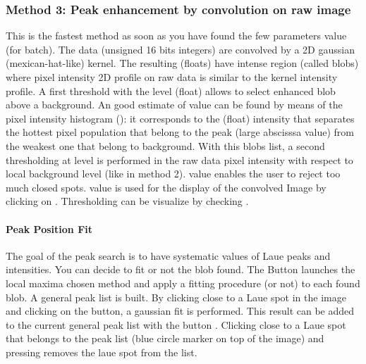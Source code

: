 \documentclass[letterpaper,10pt,english]{sphinxmanual}
\begin{document}
\subsubsection{Method 3: Peak enhancement by convolution on raw image}
\label{\detokenize{PeakSearchGUI:method-3-peak-enhancement-by-convolution-on-raw-image}}
This is the fastest method as soon as you have found the few parameters value (for batch). The  data (unsigned 16 bits integers) are convolved by a 2D gaussian (mexican-hat-like) kernel. The resulting  (floats) have intense region (called blobs) where pixel intensity 2D profile on raw data is similar to the kernel intensity profile.
A first threshold with the level  (float) allows to select enhanced blob above a background. An good estimate of  value can be found by means of the pixel intensity histogram (): it corresponds to the (float) intensity that separates the hottest pixel population that belong to the peak (large abscisssa value) from the weakest one that belong to background.
With this blobs list, a second thresholding at  level is performed in the raw data pixel intensity with respect to local background level (like in method 2).
 value enables the user to reject too much closed spots.
 value is used for the display of the convolved Image by clicking on . Thresholding can be visualize by checking .

\noindent{}


\paragraph{Peak Position Fit}
\label{\detokenize{PeakSearchGUI:peak-position-fit}}
The goal of the peak search is to have systematic values of Laue peaks and intensities. You can decide to fit or not the blob found. The Button  launches  the local maxima chosen method and apply a fitting procedure (or not) to each found blob. A general peak list is built.
By clicking close to a Laue spot in the image and clicking on the  button, a gaussian fit is performed. This result can be added to the current general peak list with the button . Clicking close to a Laue spot that belongs to the peak list (blue circle marker on top of the image) and pressing  removes the laue spot from the list.
\end{document}
